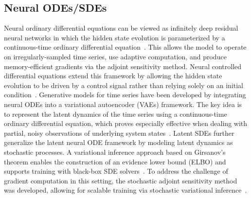 \documentclass[preprint,12pt]{elsarticle}
\begin{document}
\subsection{Neural ODEs/SDEs}
Neural ordinary differential equations can be viewed as infinitely deep residual neural networks in which the hidden state evolution is parameterized by a continuous-time ordinary differential equation~\citep{chen2018neural}. This allows the model to operate on irregularly-sampled time series, use adaptive computation, and produce memory-efficient gradients via the adjoint sensitivity method.
Neural controlled differential equations extend this framework by allowing the hidden state evolution to be driven by a control signal rather than relying solely on an initial condition~\citep{kidger2020neural}.
Generative models for time series have been developed by integrating neural ODEs into a variational autoencoder (VAEs) framework. The key idea is to represent the latent dynamics of the time series using a continuous-time ordinary differential equation, which proves especially effective when dealing with partial, noisy observations of underlying system states~\citep{rubanova2019latent,garsdal2022generative}.
Latent SDEs further generalize the latent neural ODE framework by modeling latent dynamics as stochastic processes. A variational inference approach based on Girsanov’s theorem enables the construction of an evidence lower bound (ELBO) and supports training with black-box SDE solvers~\citep{tzen2019neural}. To address the challenge of gradient computation in this setting, the stochastic adjoint sensitivity method was developed, allowing for scalable training via stochastic variational inference~\citep{li2020scalable}.
\end{document}
